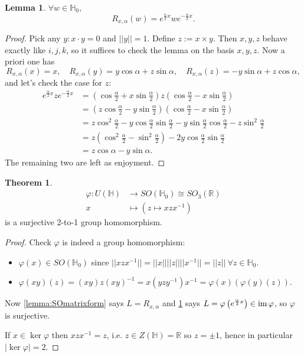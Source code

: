 \documentclass[a4paper]{article}
\newcommand{\R}{\mathbb{R}}
\newcommand{\Hq}{\mathbb{H}}
\newcommand{\im}{\text{im\,}}
\theoremstyle{definition}
\newtheorem{thm}[defn]{Theorem}
\newtheorem{lemma}[defn]{Lemma}
\begin{document}
\begin{lemma}
\label{lemma:rotatebyconjugate}
$\forall w\in\Hq_0,$
\[
R_{x,\alpha}(w)=e^{\frac{\alpha}{2}x}we^{-\frac{\alpha}{2}x}.
\]
\end{lemma}
\begin{proof}
Pick any $y:x\cdot y=0$ and $||y||=1$. Define $z:=x\times y$. Then $x,y,z$ behave exactly like $i,j,k$, so it suffices to check the lemma on the basis $x,y,z$. Now a priori one has
\[
R_{x,\alpha}(x)=x,\quad R_{x,\alpha}(y)=y\cos\alpha+z\sin\alpha,\quad R_{x,\alpha}(z)=-y\sin\alpha+z\cos\alpha,
\]
and let's check the case for $z$:
\[
\begin{aligned}
e^{\frac{\alpha}{2}x}ze^{-\frac{\alpha}{2}x}&=\left(\cos\frac{\alpha}{2}+x\sin\frac{\alpha}{2}\right)z\left(\cos\frac{\alpha}{2}-x\sin\frac{\alpha}{2}\right)\\
&=\left(z\cos\frac{\alpha}{2}-y\sin\frac{\alpha}{2}\right)\left(\cos\frac{\alpha}{2}-x\sin\frac{\alpha}{2}\right)\\
&=z\cos^2\frac{\alpha}{2}-y\cos\frac{\alpha}{2}\sin\frac{\alpha}{2}-y\sin\frac{\alpha}{2}\cos\frac{\alpha}{2}-z\sin^2\frac{\alpha}{2}\\
&=z\left(\cos^2\frac{\alpha}{2}-\sin^2\frac{\alpha}{2}\right)-2y\cos\frac{\alpha}{2}\sin\frac{\alpha}{2}\\
&=z\cos\alpha-y\sin\alpha.
\end{aligned}
\]
The remaining two are left as enjoyment.
\end{proof}

\begin{thm}
\[
\begin{aligned}
\varphi:U(\Hq)&\rightarrow SO(\Hq_0)\cong SO_3(\R)\\
x&\mapsto (z\mapsto xzx^{-1})
\end{aligned}
\]
is a surjective 2-to-1 group homomorphism.
\end{thm}
\begin{proof}
Check $\varphi$ is indeed a group homomorphism:
\begin{itemize}
\item $\varphi(x)\in SO(\Hq_0)$ since $||xzx^{-1}||=||x||||z||||x^{-1}||=||z||\ \forall z\in\Hq_0$.
\item $\varphi(xy)(z)=(xy)z(xy)^{-1}=x(yzy^{-1})x^{-1}=\varphi(x)(\varphi(y)(z))$.
\end{itemize}

Now \ref{lemma:SOmatrixform} says $L=R_{x,\alpha}$ and \ref{lemma:rotatebyconjugate} says $L=\varphi\left(e^{\frac{\alpha}{2}x}\right)\in\im\varphi$, so $\varphi$ is surjective.

If $x\in\ker\varphi$ then $xzx^{-1}=z$, i.e. $z\in Z(\Hq)=\R$ so $z=\pm 1$, hence in particular $|\ker\varphi|=2$.
\end{proof}
\end{document}
